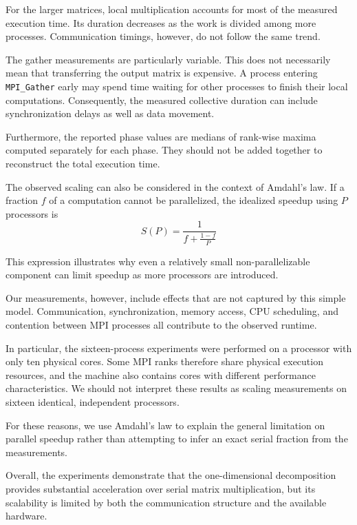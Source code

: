 For the larger matrices, local multiplication accounts for most of the measured execution time. Its duration decreases as the work is divided among more processes. Communication timings, however, do not follow the same trend.

The gather measurements are particularly variable. This does not necessarily mean that transferring the output matrix is expensive. A process entering \texttt{MPI\_Gather} early may spend time waiting for other processes to finish their local computations. Consequently, the measured collective duration can include synchronization delays as well as data movement.

Furthermore, the reported phase values are medians of rank-wise maxima computed separately for each phase. They should not be added together to reconstruct the total execution time.

The observed scaling can also be considered in the context of Amdahl's law. If a fraction $f$ of a computation cannot be parallelized, the idealized speedup using $P$ processors is
\begin{equation}
	S(P)=\frac{1}{f+\frac{1-f}{P}}
\end{equation}

This expression illustrates why even a relatively small non-parallelizable component can limit speedup as more processors are introduced.

Our measurements, however, include effects that are not captured by this simple model. Communication, synchronization, memory access, CPU scheduling, and contention between MPI processes all contribute to the observed runtime.

In particular, the sixteen-process experiments were performed on a processor with only ten physical cores. Some MPI ranks therefore share physical execution resources, and the machine also contains cores with different performance characteristics. We should not interpret these results as scaling measurements on sixteen identical, independent processors.

For these reasons, we use Amdahl's law to explain the general limitation on parallel speedup rather than attempting to infer an exact serial fraction from the measurements.

Overall, the experiments demonstrate that the one-dimensional decomposition provides substantial acceleration over serial matrix multiplication, but its scalability is limited by both the communication structure and the available hardware.


